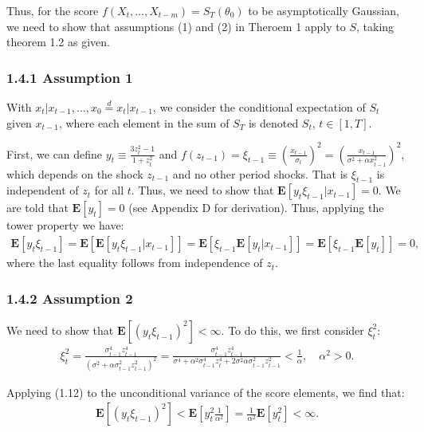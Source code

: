 \documentclass[11pt,a4paper,oneside]{article}
\newcommand{\lp}{\left(}
\newcommand{\rp}{\right)}
\newcommand{\rb}{\right]}
\newcommand{\lb}{\left[}
\newcommand{\ee}{\mathbf{E}}
\begin{document}
Thus, for the score $f\lp X_t, \dots, X_{t-m}\rp = S_T\lp \theta_0\rp$ to be asymptotically Gaussian, we need to show that assumptions (1) and (2) in Theroem 1 apply to $S$, taking theorem 1.2 as given.

\subsubsection{1.4.1 Assumption 1}
With $x_t \vert x_{t-1}, \dots, x_{0} \overset{d}{=} x_t\vert x_{t-1}$, we consider the conditional expectation of $S_t$ given $x_{t-1}$, where each element in the sum of $S_T$ is denoted $S_t$, $t \in [1, T]$. 

First, we can define $y_t \equiv \frac{3z_t^2 - 1}{1 + z_t^2}$ and $f\lp z_{t-1}\rp = \xi_{t-1} \equiv \lp \frac{x_{t-1}}{\sigma_t}\rp^2 = \lp \frac{x_{t-1}}{\sigma^2 + \alpha x_{t-1}^2}\rp^2$, which depends on the shock $z_{t-1}$ and no other period shocks. That is $\xi_{t-1}$ is independent of $z_t$ for all $t$. Thus, we need to show that $\ee\lb y_t \xi_{t-1} \vert x_{t-1}\rb = 0$. We are told that $\ee\lb y_t\rb = 0$ (see Appendix D for derivation). Thus, applying the tower property we have:
\begin{align}
    \ee\lb y_t \xi_{t-1}\rb = \ee\lb \ee\lb y_t \xi_{t-1}\vert x_{t-1}\rb \rb = \ee\lb \xi_{t-1}\ee\lb y_t\vert x_{t-1}\rb \rb = \ee\lb \xi_{t-1}\ee\lb y_t\rb \rb = 0,
\end{align}
where the last equality follows from independence of $z_t$.

\subsubsection{1.4.2 Assumption 2}
We need to show that $\ee\lb \lp y_t \xi_{t-1}\rp^2\rb < \infty$. To do this, we first consider $\xi_t^2$:
\begin{align}
    \xi_t^2 = \frac{\sigma_{t-1}^4 z_{t-1}^4}{\lp \sigma^2 + \alpha \sigma_{t-1}^2z_{t-1}^2\rp^2} = \frac{\sigma_{t-1}^4 z_{t-1}^4}{\sigma^4 + \alpha^2 \sigma_{t-1}^4 z_t^4 + 2 \sigma^2 \alpha \sigma_{t-1}^2 z_{t-1}^2} < \frac{1}{\alpha}, \quad \alpha^2 > 0.
\end{align}

Applying (1.12) to the unconditional variance of the score elements, we find that:
\begin{align}
    \ee\lb \lp y_t \xi_{t-1}\rp^2\rb < \ee\lb y_t^2 \frac{1}{\alpha^2}\rb = \frac{1}{\alpha^2}\ee\lb y_t^2\rb < \infty.
\end{align}
\end{document}
